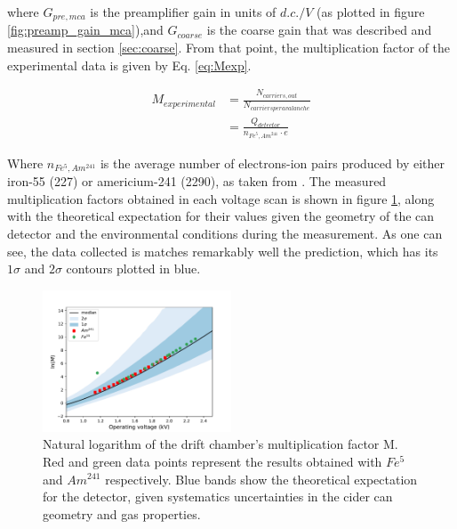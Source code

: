 where $G_{pre,mca}$ is the preamplifier gain in units of $d.c./V$ (as plotted in figure \ref{fig:preamp_gain_mca}),and $G_{coarse}$ is the coarse gain that was described and measured in section \ref{sec:coarse}. From that point, the multiplication factor of the experimental data is given by Eq. \ref{eq:Mexp}.

\begin{align}
  \label{eq:Mexp}
  M_{experimental} &= \frac{N_{carriers,out}}{N_{carriers per avalanche}} \nonumber \\
                   &= \frac{Q_{detector}}{n_{Fe^{5},Am^{241}}\cdot e}
\end{align}

Where $n_{Fe^{5},Am^{241}}$ is the average number of electrons-ion pairs produced by either iron-55 (227) or americium-241 (2290), as taken from \cite{can_paper}. The measured multiplication factors obtained in each voltage scan is shown in figure \ref{final_lnm}, along with the theoretical expectation for their values given the geometry of the can detector and the environmental conditions during the measurement. As one can see, the data collected is matches remarkably well the prediction, which has its $1\sigma$ and $2\sigma$ contours plotted in blue.

\begin{figure}[htb]
  \includegraphics[width=0.5\textwidth]{graphics/lnM_final_plot.pdf}
  \caption{Natural logarithm of the drift chamber's multiplication factor M. Red and green data points represent the results obtained with $Fe^{5}$ and $Am^{241}$ respectively. Blue bands show the theoretical expectation for the detector, given systematics uncertainties in the cider can geometry and gas properties.}
  \label{final_lnm}
\end{figure}

